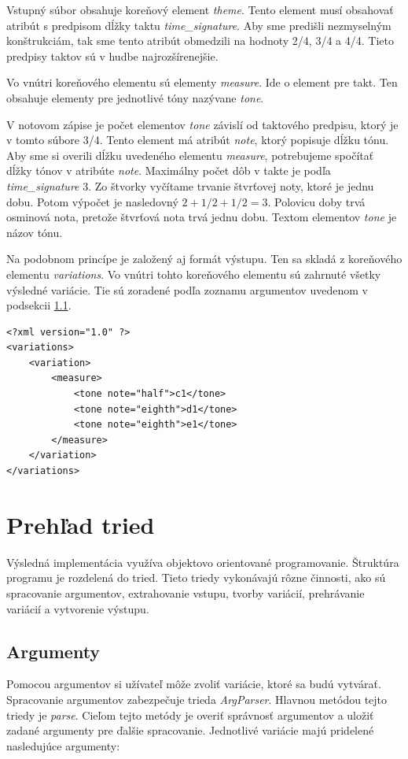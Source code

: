 Vstupný súbor obsahuje koreňový element \textit{theme}. Tento element musí obsahovať atribút s predpisom dĺžky taktu \textit{time\_signature}. Aby sme predišli nezmyselným konštrukciám, tak sme tento atribút obmedzili na hodnoty 2/4, 3/4 a 4/4. Tieto predpisy taktov sú v hudbe najrozšírenejšie.

Vo vnútri koreňového elementu sú elementy \textit{measure}. Ide o element pre takt. Ten obsahuje elementy pre jednotlivé tóny nazývane \textit{tone}.

V notovom zápise je počet elementov \textit{tone} závislí od taktového predpisu, ktorý je v tomto súbore 3/4. Tento element má atribút \textit{note}, ktorý popisuje dĺžku tónu. Aby sme si overili dĺžku uvedeného elementu \textit{measure}, potrebujeme spočítať dĺžky tónov v atribúte \textit{note}. Maximálny počet dôb v takte je podľa \textit{time\_signature} 3. Zo štvorky vyčítame trvanie štvrťovej noty, ktoré je jednu dobu. Potom výpočet je nasledovný $2 + 1/2 + 1/2 = 3.$ Polovicu doby trvá osminová nota, pretože štvrťová nota trvá jednu dobu. Textom elementov \textit{tone} je názov tónu.

Na podobnom princípe je založený aj formát výstupu. Ten sa skladá z koreňového elementu \textit{variations}. Vo vnútri tohto koreňového elementu sú zahrnuté všetky výsledné variácie. Tie sú zoradené podľa zoznamu argumentov uvedenom v podsekcii \ref{args}.

\lstset{language=XML}
\begin{lstlisting}
<?xml version="1.0" ?>
<variations>
	<variation>
		<measure>
			<tone note="half">c1</tone>
			<tone note="eighth">d1</tone>
			<tone note="eighth">e1</tone>
		</measure>
	</variation>
</variations>
\end{lstlisting}

\section{Prehľad tried}
Výsledná implementácia využíva objektovo orientované programovanie. Štruktúra programu je rozdelená do tried. Tieto triedy vykonávajú rôzne činnosti, ako sú spracovanie argumentov, extrahovanie vstupu, tvorby variácií, prehrávanie variácií a vytvorenie výstupu.

\subsection{Argumenty}
\label{args}
Pomocou argumentov si užívateľ môže zvoliť variácie, ktoré sa budú vytvárať. Spracovanie argumentov zabezpečuje trieda \textit{ArgParser}. Hlavnou metódou tejto triedy je \textit{parse}. Cieľom tejto metódy je overiť správnosť argumentov a uložiť zadané argumenty pre ďalšie spracovanie. Jednotlivé variácie majú pridelené nasledujúce argumenty:

